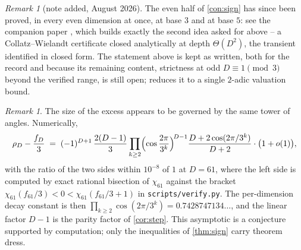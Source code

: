 \documentclass[11pt]{amsart}
\theoremstyle{definition}
\theoremstyle{remark}
\newtheorem{remark}[theorem]{Remark}
\begin{document}
\begin{remark}[note added, August 2026]
\label{rem:noteadded}
The even half of \cref{con:sign} has since been proved, in every even dimension at once, at base $3$ and at base $5$: see the companion paper \cite{evenhalf}, which builds exactly the second idea asked for above -- a Collatz--Wielandt certificate closed analytically at depth $\Theta(D^2)$, the transient identified in closed form. The statement above is kept as written, both for the record and because its remaining content, strictness at odd $D \equiv 1 \pmod 3$ beyond the verified range, is still open; \cite{evenhalf} reduces it to a single $2$-adic valuation bound.
\end{remark}

\begin{remark}
\label{rem:rate}
The size of the excess appears to be governed by the same tower of angles. Numerically,
\[
\rho_D - \frac{f_D}{3} \;=\; (-1)^{D+1}\, \frac{2(D-1)}{3} \prod_{k \ge 2} \Bigl( \cos \frac{2\pi}{3^k} \Bigr)^{\!D-1} \frac{D + 2\cos(2\pi/3^k)}{D+2} \cdot \bigl(1 + o(1)\bigr),
\]
with the ratio of the two sides within $10^{-8}$ of $1$ at $D = 61$, where the left side is computed by exact rational bisection of $\chi_{61}$ against the bracket $\chi_{61}(f_{61}/3) < 0 < \chi_{61}(f_{61}/3 + 1)$ in \texttt{scripts/verify.py}. The per-dimension decay constant is then $\prod_{k\ge2} \cos(2\pi/3^k) = 0.7428747134\ldots$, and the linear factor $D-1$ is the parity factor of \cref{cor:step}. This asymptotic is a conjecture supported by computation; only the inequalities of \cref{thm:sign} carry theorem dress.
\end{remark}
\end{document}
